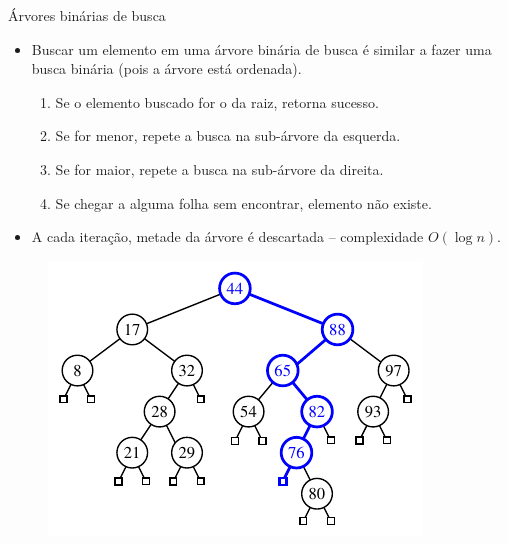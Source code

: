 \begin{frame}{Árvores binárias de busca}
\begin{itemize}
	\item Buscar um elemento em uma árvore binária de busca é similar a fazer uma busca binária (pois a árvore está ordenada).
	\begin{enumerate}
		\item Se o elemento buscado for o da raiz, retorna sucesso.
		\item Se for menor, repete a busca na sub-árvore da esquerda.
		\item Se for maior, repete a busca na sub-árvore da direita.
		\item Se chegar a alguma folha sem encontrar, elemento não existe.
	\end{enumerate}
	\item A cada iteração, metade da árvore é descartada -- complexidade $O(\log n)$.
\end{itemize}

\vspace{-5pt}

\begin{figure}
	\centering
	\includegraphics[width=0.55\linewidth]{img/figure-11-2b}
\end{figure}
\end{frame}



